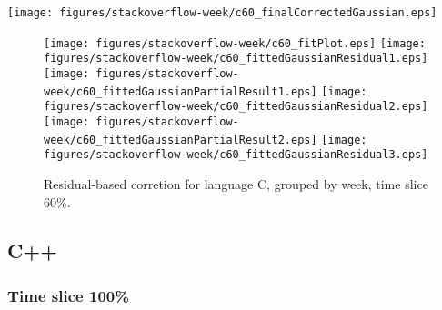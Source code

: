 \begin{center}
{\texttt{[image: figures/stackoverflow-week/c60\_finalCorrectedGaussian.eps]}}
\end{center}

\FloatBarrier

\begin{figure}[t]
\centering
{}
{\texttt{[image: figures/stackoverflow-week/c60\_fitPlot.eps]}}
{\texttt{[image: figures/stackoverflow-week/c60\_fittedGaussianResidual1.eps]}}
{\texttt{[image: figures/stackoverflow-week/c60\_fittedGaussianPartialResult1.eps]}}
{\texttt{[image: figures/stackoverflow-week/c60\_fittedGaussianResidual2.eps]}}
{\texttt{[image: figures/stackoverflow-week/c60\_fittedGaussianPartialResult2.eps]}}
{\texttt{[image: figures/stackoverflow-week/c60\_fittedGaussianResidual3.eps]}}
\caption{Residual-based corretion for language C, grouped by week, time slice 60\%.}
\end{figure}


\FloatBarrier


\subsection{C++}

\subsubsection{Time slice 100\%}

